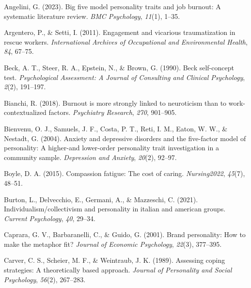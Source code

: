 \documentclass[
  man]{apa6}
\newlength{\cslhangindent}
\newlength{\cslentryspacingunit} %
\newenvironment{CSLReferences}[2] %
 {%
  \setlength{\parindent}{0pt}
  \ifodd #1
  \let\oldpar\par
  \def\par{\hangindent=\cslhangindent\oldpar}
  \fi
  \setlength{\parskip}{#2\cslentryspacingunit}
 }%
 {}
\begin{document}
\hypertarget{refs}{}
\begin{CSLReferences}{1}{0}
\leavevmode{}%
Angelini, G. (2023). Big five model personality traits and job burnout: A systematic literature review. \emph{BMC Psychology}, \emph{11}(1), 1--35.

\leavevmode{}%
Argentero, P., \& Setti, I. (2011). Engagement and vicarious traumatization in rescue workers. \emph{International Archives of Occupational and Environmental Health}, \emph{84}, 67--75.

\leavevmode{}%
Beck, A. T., Steer, R. A., Epstein, N., \& Brown, G. (1990). Beck self-concept test. \emph{Psychological Assessment: A Journal of Consulting and Clinical Psychology}, \emph{2}(2), 191--197.

\leavevmode{}%
Bianchi, R. (2018). Burnout is more strongly linked to neuroticism than to work-contextualized factors. \emph{Psychiatry Research}, \emph{270}, 901--905.

\leavevmode{}%
Bienvenu, O. J., Samuels, J. F., Costa, P. T., Reti, I. M., Eaton, W. W., \& Nestadt, G. (2004). Anxiety and depressive disorders and the five-factor model of personality: A higher-and lower-order personality trait investigation in a community sample. \emph{Depression and Anxiety}, \emph{20}(2), 92--97.

\leavevmode{}%
Boyle, D. A. (2015). Compassion fatigue: The cost of caring. \emph{Nursing2022}, \emph{45}(7), 48--51.

\leavevmode{}%
Burton, L., Delvecchio, E., Germani, A., \& Mazzeschi, C. (2021). Individualism/collectivism and personality in italian and american groups. \emph{Current Psychology}, \emph{40}, 29--34.

\leavevmode{}%
Caprara, G. V., Barbaranelli, C., \& Guido, G. (2001). Brand personality: How to make the metaphor fit? \emph{Journal of Economic Psychology}, \emph{22}(3), 377--395.

\leavevmode{}%
Carver, C. S., Scheier, M. F., \& Weintraub, J. K. (1989). Assessing coping strategies: A theoretically based approach. \emph{Journal of Personality and Social Psychology}, \emph{56}(2), 267--283.


\end{CSLReferences}
\end{document}
